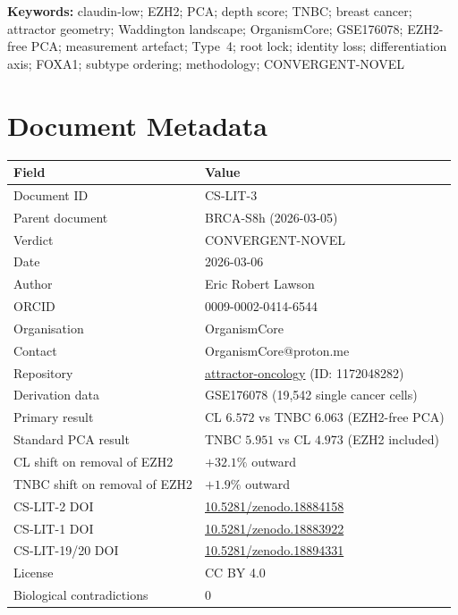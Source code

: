 \documentclass[12pt, a4paper]{article}
\begin{document}
\vspace{0.5em}
\noindent\textbf{Keywords:}
claudin-low; EZH2; PCA; depth score; TNBC; breast
cancer; attractor geometry; Waddington landscape;
OrganismCore; GSE176078; EZH2-free PCA; measurement
artefact; Type~4; root lock; identity loss;
differentiation axis; FOXA1; subtype ordering;
methodology; CONVERGENT-NOVEL

\newpage
\tableofcontents
\newpage

\section{Document Metadata}

\begin{center}
\begin{tabular}{ll}
\toprule
\textbf{Field} & \textbf{Value} \\
\midrule
Document ID & CS-LIT-3 \\
Parent document & BRCA-S8h (2026-03-05) \\
Verdict & CONVERGENT-NOVEL \\
Date & 2026-03-06 \\
Author & Eric Robert Lawson \\
ORCID & 0009-0002-0414-6544 \\
Organisation & OrganismCore \\
Contact & OrganismCore@proton.me \\
Repository &
\href{https://github.com/Eric-Robert-Lawson/attractor-oncology}
{attractor-oncology} (ID: 1172048282) \\
Derivation data & GSE176078 (19,542 single cancer cells) \\
Primary result &
CL $6.572$ vs TNBC $6.063$ (EZH2-free PCA) \\
Standard PCA result &
TNBC $5.951$ vs CL $4.973$ (EZH2 included) \\
CL shift on removal of EZH2 &
$+32.1\%$ outward \\
TNBC shift on removal of EZH2 &
$+1.9\%$ outward \\
CS-LIT-2 DOI &
\href{https://doi.org/10.5281/zenodo.18884158}
{10.5281/zenodo.18884158} \\
CS-LIT-1 DOI &
\href{https://doi.org/10.5281/zenodo.18883922}
{10.5281/zenodo.18883922} \\
CS-LIT-19/20 DOI &
\href{https://doi.org/10.5281/zenodo.18894331}
{10.5281/zenodo.18894331} \\
License & CC BY 4.0 \\
Biological contradictions & 0 \\
\bottomrule
\end{tabular}
\end{center}
\end{document}
